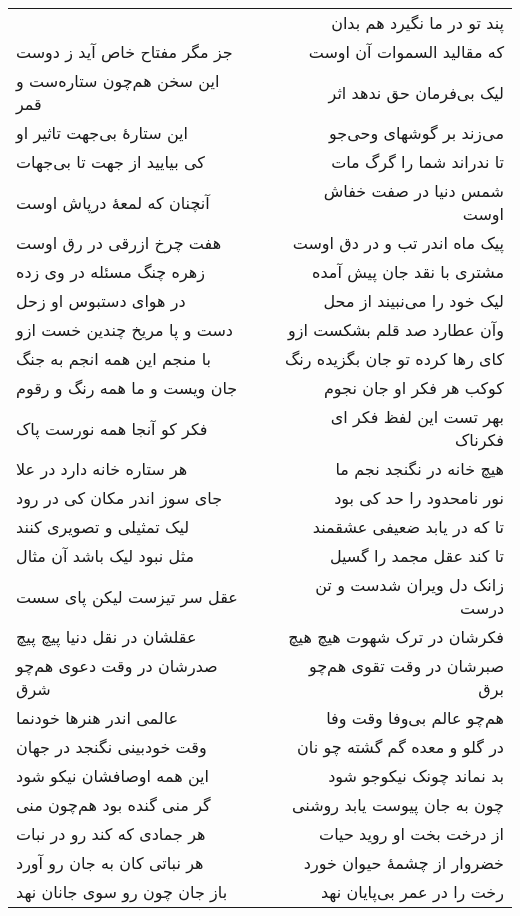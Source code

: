 \begin{center}
\begin{longtable}{l p{0.5cm} r}
&&
پند تو در ما نگیرد هم بدان
\\
جز مگر مفتاح خاص آید ز دوست
&&
که مقالید السموات آن اوست
\\
این سخن هم‌چون ستاره‌ست و قمر
&&
لیک بی‌فرمان حق ندهد اثر
\\
این ستارهٔ بی‌جهت تاثیر او
&&
می‌زند بر گوشهای وحی‌جو
\\
کی بیایید از جهت تا بی‌جهات
&&
تا ندراند شما را گرگ مات
\\
آنچنان که لمعهٔ درپاش اوست
&&
شمس دنیا در صفت خفاش اوست
\\
هفت چرخ ازرقی در رق اوست
&&
پیک ماه اندر تب و در دق اوست
\\
زهره چنگ مسئله در وی زده
&&
مشتری با نقد جان پیش آمده
\\
در هوای دستبوس او زحل
&&
لیک خود را می‌نبیند از محل
\\
دست و پا مریخ چندین خست ازو
&&
وآن عطارد صد قلم بشکست ازو
\\
با منجم این همه انجم به جنگ
&&
کای رها کرده تو جان بگزیده رنگ
\\
جان ویست و ما همه رنگ و رقوم
&&
کوکب هر فکر او جان نجوم
\\
فکر کو آنجا همه نورست پاک
&&
بهر تست این لفظ فکر ای فکرناک
\\
هر ستاره خانه دارد در علا
&&
هیچ خانه در نگنجد نجم ما
\\
جای سوز اندر مکان کی در رود
&&
نور نامحدود را حد کی بود
\\
لیک تمثیلی و تصویری کنند
&&
تا که در یابد ضعیفی عشقمند
\\
مثل نبود لیک باشد آن مثال
&&
تا کند عقل مجمد را گسیل
\\
عقل سر تیزست لیکن پای سست
&&
زانک دل ویران شدست و تن درست
\\
عقلشان در نقل دنیا پیچ پیچ
&&
فکرشان در ترک شهوت هیچ هیچ
\\
صدرشان در وقت دعوی هم‌چو شرق
&&
صبرشان در وقت تقوی هم‌چو برق
\\
عالمی اندر هنرها خودنما
&&
هم‌چو عالم بی‌وفا وقت وفا
\\
وقت خودبینی نگنجد در جهان
&&
در گلو و معده گم گشته چو نان
\\
این همه اوصافشان نیکو شود
&&
بد نماند چونک نیکوجو شود
\\
گر منی گنده بود هم‌چون منی
&&
چون به جان پیوست یابد روشنی
\\
هر جمادی که کند رو در نبات
&&
از درخت بخت او روید حیات
\\
هر نباتی کان به جان رو آورد
&&
خضروار از چشمهٔ حیوان خورد
\\
باز جان چون رو سوی جانان نهد
&&
رخت را در عمر بی‌پایان نهد
\\
\end{longtable}
\end{center}
